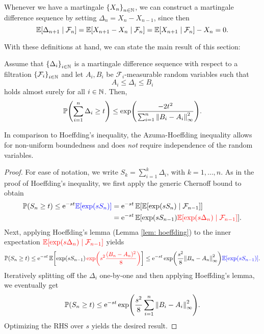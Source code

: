 Whenever we have a martingale $\set{X_n}_{n \in \N}$, we can construct a martingale difference sequence by setting $\Delta_n = X_n - X_{n-1}$, since then
\[
    \operatorname{\mathbb{E}}[\Delta_{n+1} \mathrel{|} \mathcal{F}_n] = \operatorname{\mathbb{E}}[X_{n+1} - X_n \mathrel{|} \mathcal{F}_n] = \operatorname{\mathbb{E}}[X_{n+1} \mathrel{|} \mathcal{F}_n] - X_n = 0.
\]

With these definitions at hand, we can state the main result of this section:

\begin{theorem}
\label{thm: azuma-hoeffding}
Assume that $\set{\Delta_i}_{i \in \N}$ is a martingale difference sequence with respect to a filtration $\set{\mathcal{F}_i}_{i \in \N}$ and let $A_i, B_i$ be $\mathcal{F}_i$-measurable random variables such that
\[
    A_i \leq \Delta_i \leq B_i
\]
holds almost surely for all $i \in \mathbb{N}$. Then,
\[
    \P\left(\sum_{i=1}^n \Delta_i \geq t\right) \leq \exp(\frac{-2t^2}{\sum_{i=1}^n \norm{B_i - A_i}_{\infty}^2}).
\]
\end{theorem}

In comparison to Hoeffding’s inequality, the Azuma-Hoeffding inequality allows for non-uniform boundedness and does \emph{not} require independence of the random variables.

\begin{proof}
For ease of notation, we write $S_k = \sum_{i=1}^k \Delta_i$, with $k = 1, \dots, n$. As in the proof of Hoeffding's inequality, we first apply the generic Chernoff bound to obtain
\begin{align*}
    \mathbb{P}(S_n \geq t) \leq \mathrm{e}^{-st} {\color{blue} \operatorname{\mathbb{E}}[\exp(s S_n)]} &= \mathrm{e}^{-st} \operatorname{\mathbb{E}}[\operatorname{\mathbb{E}}[\exp(s S_n) \mathrel{|} \mathcal{F}_{n-1}]] \\
    &= \mathrm{e}^{-st} \operatorname{\mathbb{E}}[\exp(s S_{n-1}) {\color{red} \operatorname{\mathbb{E}}[\exp(s \Delta_n) \mathrel{|} \mathcal{F}_{n-1}]}].
\end{align*}
Next, applying Hoeffding's lemma (Lemma \ref{lem: hoeffding}) to the inner expectation ${\color{red} \operatorname{\mathbb{E}}[\exp(s \Delta_n) \mathrel{|} \mathcal{F}_{n-1}]}$ yields
\[
    \P(S_n \geq t) \leq \e^{-st} \Exp\left[\exp(s S_{n-1}) \, {\color{red} \exp(s^2 \frac{(B_n - A_n)^2}{8})}\right] \leq \e^{-st} \exp(\frac{s^2}{8} \norm{B_n - A_n}_{\infty}^2) {\color{blue} \Exp[\exp(s S_{n-1})]}.
\]
Iteratively splitting off the $\Delta_i$ one-by-one and then applying Hoeffding's lemma, we eventually get
\[
    \mathbb{P}(S_n \geq t) \leq \mathrm{e}^{-st} \exp(\frac{s^2}{8} \sum_{i=1}^n \norm{B_i - A_i}_{\infty}^2).
\]
Optimizing the RHS over $s$ yields the desired result.
\end{proof}
